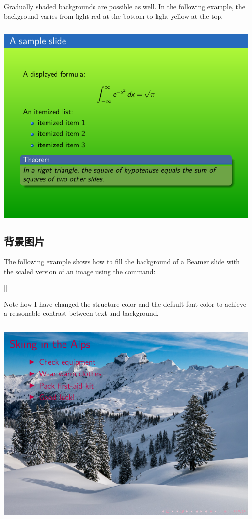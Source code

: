 \begin{column}{0.5\textwidth}
Gradually shaded backgrounds are possible as well. In the following example, the background varies from light red at the bottom to light yellow at the top.

\inputminted[linenos=true]{latex}{examples/beamer/beamertheme09.tex}

\includegraphics{examples/beamer/beamertheme09.pdf}

\subsection{背景图片}

The following example shows how to fill the background of a Beamer slide with the scaled version of an image using the command:

||

Note how I have changed the structure color and the default font color to achieve a reasonable contrast between text and background.

\inputminted[linenos=true]{latex}{examples/beamer/beamertheme10.tex}

\includegraphics{examples/beamer/beamertheme10.pdf}


\end{column}
